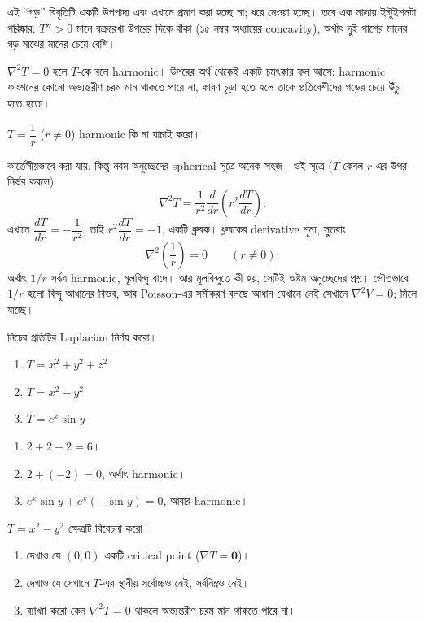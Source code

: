 \documentclass[11pt]{article}
\begin{document}
এই ``গড়'' বিবৃতিটি একটি উপপাদ্য এবং এখানে প্রমাণ করা হচ্ছে না; ধরে নেওয়া
হচ্ছে। তবে এক মাত্রায় ইন্টুইশনটা পরিষ্কার: $T'' > 0$ মানে বক্ররেখা উপরের দিকে
বাঁকা (১৫ নম্বর অধ্যায়ের concavity), অর্থাৎ দুই পাশের মানের গড় মাঝের
মানের চেয়ে বেশি।

$\nabla^{2}T = 0$ হলে $T$-কে বলে harmonic। উপরের অর্থ থেকেই একটি চমৎকার ফল
আসে: harmonic ফাংশনের কোনো অভ্যন্তরীণ চরম মান থাকতে পারে না, কারণ চূড়া হতে
হলে তাকে প্রতিবেশীদের গড়ের চেয়ে উঁচু হতে হতো।

\begin{example}
$T = \dfrac{1}{r}$ ($r \neq 0$) harmonic কি না যাচাই করো।
\end{example}

\begin{solbox}
কার্তেসীয়ভাবে করা যায়, কিন্তু নবম অনুচ্ছেদের spherical সূত্রে অনেক সহজ। ওই
সূত্রে ($T$ কেবল $r$-এর উপর নির্ভর করলে)
\[
  \nabla^{2}T = \frac{1}{r^{2}}\frac{d}{dr}
  \left( r^{2}\frac{dT}{dr} \right) .
\]
এখানে $\dfrac{dT}{dr} = -\dfrac{1}{r^{2}}$, তাই
$r^{2}\dfrac{dT}{dr} = -1$, একটি ধ্রুবক। ধ্রুবকের derivative শূন্য, সুতরাং
\[
  \nabla^{2}\left( \frac{1}{r} \right) = 0 \qquad (r \neq 0) .
\]
অর্থাৎ $1/r$ সর্বত্র harmonic, মূলবিন্দু বাদে। আর মূলবিন্দুতে কী হয়, সেটিই
অষ্টম অনুচ্ছেদের প্রশ্ন। ভৌতভাবে $1/r$ হলো বিন্দু আধানের বিভব, আর
Poisson-এর সমীকরণ বলছে আধান যেখানে নেই সেখানে $\nabla^{2}V = 0$; মিলে যাচ্ছে।
\end{solbox}

 নিচের প্রতিটির Laplacian নির্ণয় করো।
\begin{enumerate}
  \item $T = x^{2}+y^{2}+z^{2}$
  \item $T = x^{2}-y^{2}$
  \item $T = e^{x}\sin y$
\end{enumerate}

\begin{sol}
\begin{enumerate}
  \item $2+2+2 = 6$।
  \item $2 + (-2) = 0$, অর্থাৎ harmonic।
  \item $e^{x}\sin y + e^{x}(-\sin y) = 0$, আবার harmonic।
\end{enumerate}
\end{sol}

 $T = x^{2}-y^{2}$ ক্ষেত্রটি বিবেচনা করো।
\begin{enumerate}
  \item দেখাও যে $(0,0)$ একটি critical point ($\nabla T = \mathbf{0}$)।
  \item দেখাও যে সেখানে $T$-এর স্থানীয় সর্বোচ্চও নেই, সর্বনিম্নও নেই।
  \item ব্যাখ্যা করো কেন $\nabla^{2}T = 0$ থাকলে অভ্যন্তরীণ চরম মান থাকতে
        পারে না।
\end{enumerate}
\end{document}
